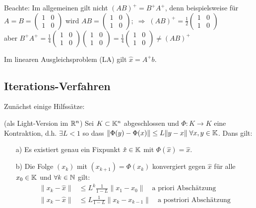 Beachte: Im allgemeinen gilt nicht $(A B)^+ = B^+ A^+$, denn beispielsweise für
$A = B = \begin{pmatrix} 1 & 0 \\ 1 & 0 \end{pmatrix}$ wird
$A B = \begin{pmatrix} 1 & 0 \\ 1 & 0 \end{pmatrix};  \; \Rightarrow \;
(A B)^+ = \frac{1}{2}\begin{pmatrix} 1 & 0 \\ 1 & 0 \end{pmatrix}$ \\
aber $B^+ A^+ = \frac{1}{4}\begin{pmatrix} 1 & 0 \\ 1 & 0 \end{pmatrix}\begin{pmatrix} 1 & 0 \\ 1 & 0 \end{pmatrix} = \frac{1}{4}\begin{pmatrix} 1 & 0 \\ 1 & 0 \end{pmatrix} \ne (A B)^+$

\begin{Bemerkung}
  Im linearen Ausgleichsproblem (LA) gilt $\hat{x} = A^+ b$.
\end{Bemerkung}


\subsection{Iterations-Verfahren}
Zunächst einige Hilfssätze:
\begin{Satz} (als Light-Version im $\mathbb R^n$) Sei $K \subset \mathbb K^n$
abgeschlossen und  $\Phi: K \rightarrow K$ eine Kontraktion, d.h. $\exists L < 1$ so dass
$\|\Phi(y) - \Phi(x) \| \le L \| y - x\| \; \forall x, y \in \mathbb K$. Dans gilt:
\begin{enumerate}
  \item[a)] Es existiert genau ein Fixpunkt $\hat{x} \in \mathbb K$ mit $\Phi(\hat{x}) = \hat{x}$.
  \item[b)] Die Folge $(x_k)$ mit $(x_{k+1}) = \Phi(x_k)$ konvergiert gegen
  $\hat{x}$ für alle $x_0 \in \mathbb K$ und $\forall k \in \mathbb N$ gilt:
  \begin{align*}
    \| x_k - \hat{x}\| & \le L^k \frac{1}{1 - L} \|x_1 - x_0\| \quad \text{a priori Abschätzung} \\
    \| x_k - \hat{x}\| & \le L \frac{1}{1 - L} \|x_k - x_{k -1}\| \quad \text{a postriori Abschätzung}
  \end{align*}
\end{enumerate}
\end{Satz}

